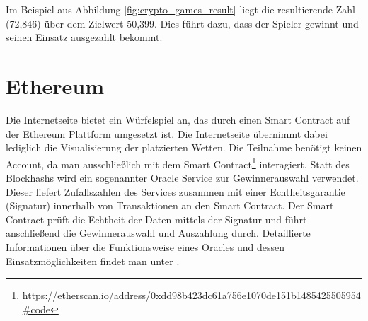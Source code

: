 Im Beispiel aus Abbildung \ref{fig:crypto_games_result} liegt die resultierende Zahl (72,846) über dem Zielwert 50,399. Dies führt dazu, dass der Spieler gewinnt und seinen Einsatz ausgezahlt bekommt.

\section{Ethereum}

Die Internetseite \cite{vdice} bietet ein Würfelspiel an, das durch einen Smart Contract auf der Ethereum Plattform umgesetzt ist. Die Internetseite übernimmt dabei lediglich die Visualisierung der platzierten Wetten. Die Teilnahme benötigt keinen Account, da man ausschließlich mit dem Smart Contract\footnote{\url{https://etherscan.io/address/0xdd98b423dc61a756e1070de151b1485425505954\#code}} interagiert. Statt des Blockhashs wird ein sogenannter Oracle Service \cite{oracalize_it} zur Gewinnerauswahl verwendet. Dieser liefert Zufallszahlen des Services \cite{random_org} zusammen mit einer Echtheitsgarantie (Signatur) innerhalb von Transaktionen an den Smart Contract. Der Smart Contract prüft die Echtheit der Daten mittels der Signatur und führt anschließend die Gewinnerauswahl und Auszahlung durch. Detaillierte Informationen über die Funktionsweise eines Oracles und dessen Einsatzmöglichkeiten findet man unter \cite{eth_oracles}.